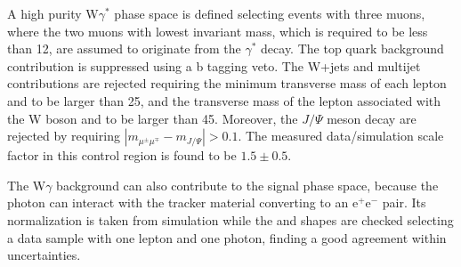 A high purity W$\gamma^*$ phase space is defined selecting events with three muons, where the two muons with lowest invariant mass, which is required to be less than 12\GeV, are assumed to originate from the $\gamma^*$ decay. The top quark background contribution is suppressed using a b tagging veto. The W+jets and multijet contributions are rejected requiring the minimum transverse mass of each lepton and \MET to be larger than 25\GeV, and the transverse mass of the lepton associated with the W boson and \MET to be larger than 45\GeV. Moreover, the $J/\Psi$ meson decay are rejected by requiring $|m_{\mu^{\pm}\mu^{\mp}} - m_{J/\Psi}|>0.1$\GeV.
The measured data/simulation scale factor in this control region is found to be $1.5 \pm 0.5$.

The W$\gamma$ background can also contribute to the signal phase space, because the photon can interact with the tracker material converting to an $\mathrm{e^+e^-}$ pair. Its normalization is taken from simulation while the \mll and \mt shapes are checked selecting a data sample with one lepton and one photon, finding a good agreement within uncertainties.

